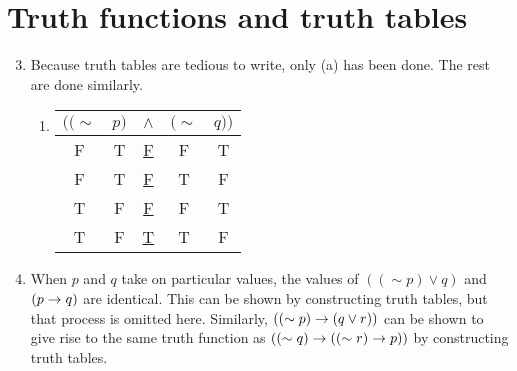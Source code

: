 \section{Truth functions and truth tables}

\solutions{}

\begin{enumerate}
  \setcounter{enumi}{2}
  \item %
    Because truth tables are tedious to write, only (a) has been done. The rest are done similarly.
    \begin{enumerate}[(\alph*), align=left]
      \item
        \begin{tabular}{ccccc}
          \(((\sim\)&
          \(p)\)&
          \(\wedge\)&
          \((\sim\)&
          \(q))\)\\\hline

          F&
          T&
          \underline{F}&
          F&
          T\\

          F&
          T&
          \underline{F}&
          T&
          F\\

          T&
          F&
          \underline{F}&
          F&
          T\\

          T&
          F&
          \underline{T}&
          T&
          F
        \end{tabular}

    \end{enumerate}

  \item %
    When \(p\) and \(q\) take on particular values, the values of \(((\sim p) \lor q)\) and \((p \rightarrow q)\) are identical. This can be shown by constructing truth tables, but that process is omitted here. Similarly, \(((\sim p) \rightarrow (q \lor r))\) can be shown to give rise to the same truth function as \(((\sim q) \rightarrow ((\sim r) \rightarrow p))\) by constructing truth tables.


\end{enumerate}
